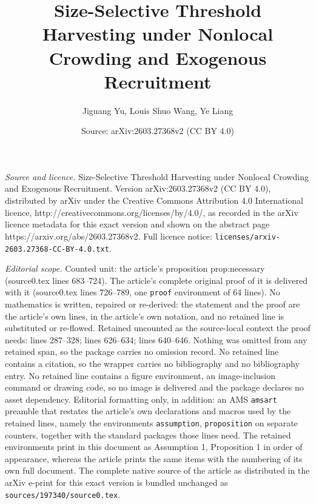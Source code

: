 \documentclass[10pt,a4paper]{amsart}
\title{Size-Selective Threshold Harvesting under Nonlocal Crowding and Exogenous Recruitment}
\author{Jiguang Yu, Louis Shuo Wang, Ye Liang}
\date{Source: arXiv:2603.27368v2 (CC BY 4.0)}
\begin{document}
\maketitle

\noindent\emph{Source and licence.} Size-Selective Threshold Harvesting under Nonlocal Crowding and Exogenous Recruitment. Version arXiv:2603.27368v2 (CC BY 4.0), distributed by arXiv under the Creative Commons Attribution 4.0 International licence, http://creativecommons.org/licenses/by/4.0/, as recorded in the arXiv licence metadata for this exact version and shown on the abstract page https://arxiv.org/abs/2603.27368v2. Full licence notice: \texttt{licenses/arxiv-2603.27368-CC-BY-4.0.txt}.\par\smallskip

\noindent\textit{Editorial scope.} Counted unit: the article's proposition prop:necessary (source0.tex lines 683--724). The article's complete original proof of it is delivered with it (source0.tex lines 726--789, one \texttt{proof} environment of 64 lines). No mathematics is written, repaired or re-derived: the statement and the proof are the article's own lines, in the article's own notation, and no retained line is substituted or re-flowed.  Retained uncounted as the source-local context the proof needs: lines 287--328; lines 626--634; lines 640--646.  Nothing was omitted from any retained span, so the package carries no omission record.  No retained line contains a citation, so the wrapper carries no bibliography and no bibliography entry.  No retained line contains a figure environment, an image-inclusion command or drawing code, so no image is delivered and the package declares no asset dependency.  Editorial formatting only, in addition: an AMS \texttt{amsart} preamble that restates the article's own declarations and macros used by the retained lines, namely the environments \texttt{assumption}, \texttt{proposition} on separate counters, together with the standard packages those lines need.  The retained environments print in this document as Assumption 1, Proposition 1 in order of appearance, whereas the article prints the same items with the numbering of its own full document.  The complete native source of the article as distributed in the arXiv e-print for this exact version is bundled unchanged as \texttt{sources/197340/source0.tex}.
\end{document}
